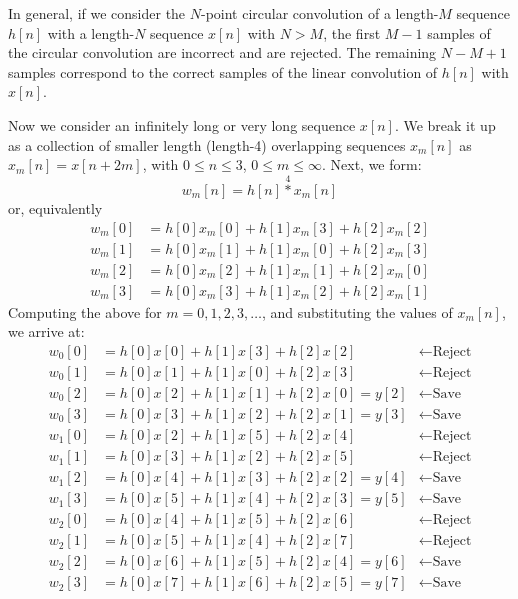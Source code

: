 \documentclass[../../main/main.tex]{subfiles}
\begin{document}
In general, if we consider the \( N \)-point circular convolution of a length-\( M \) sequence \( h[n] \) with a length-\( N \) sequence \( x[n] \) with \( N > M \), the first \( M - 1 \) samples of the circular convolution are incorrect and are rejected. The remaining \( N - M + 1 \) samples correspond to the correct samples of the linear convolution of \( h[n] \) with \( x[n] \).

Now we consider an infinitely long or very long sequence \( x[n] \). We break it up as a collection of smaller length (length-4) overlapping sequences \( x_{m}[n] \) as \( x_{m}[n] = x[n+2m] \), with \( 0 \le n \le 3 \), \( 0 \le m \le \infty \). Next, we form:
\begin{equation}
    w_{m}[n]
    =
    h[n] \overset{4}{*} x_{m}[n]
    \label{eq:L13_S35_1}
\end{equation}
or, equivalently
\begin{align}
    w_{m}[0] &= h[0]x_{m}[0] + h[1]x_{m}[3] + h[2]x_{m}[2]  \\
    w_{m}[1] &= h[0]x_{m}[1] + h[1]x_{m}[0] + h[2]x_{m}[3]  \\
    w_{m}[2] &= h[0]x_{m}[2] + h[1]x_{m}[1] + h[2]x_{m}[0]  \\
    w_{m}[3] &= h[0]x_{m}[3] + h[1]x_{m}[2] + h[2]x_{m}[1]
\end{align}
Computing the above for \( m = 0, 1, 2, 3, \dots \), and substituting the values of \( x_{m}[n] \), we arrive at:
\begin{align*}
    w_{0}[0] &= h[0]x[0] + h[1]x[3] + h[2]x[2]          &   \leftarrow \text{Reject}  \\
    w_{0}[1] &= h[0]x[1] + h[1]x[0] + h[2]x[3]          &   \leftarrow \text{Reject} \\
    w_{0}[2] &= h[0]x[2] + h[1]x[1] + h[2]x[0] = y[2]   &   \leftarrow \text{Save}  \\
    w_{0}[3] &= h[0]x[3] + h[1]x[2] + h[2]x[1] = y[3]   &   \leftarrow \text{Save}  \\
    w_{1}[0] &= h[0]x[2] + h[1]x[5] + h[2]x[4]          &   \leftarrow \text{Reject}  \\
    w_{1}[1] &= h[0]x[3] + h[1]x[2] + h[2]x[5]          &   \leftarrow \text{Reject} \\
    w_{1}[2] &= h[0]x[4] + h[1]x[3] + h[2]x[2] = y[4]   &   \leftarrow \text{Save}  \\
    w_{1}[3] &= h[0]x[5] + h[1]x[4] + h[2]x[3] = y[5]   &   \leftarrow \text{Save}  \\
    w_{2}[0] &= h[0]x[4] + h[1]x[5] + h[2]x[6]          &   \leftarrow \text{Reject}  \\
    w_{2}[1] &= h[0]x[5] + h[1]x[4] + h[2]x[7]          &   \leftarrow \text{Reject} \\
    w_{2}[2] &= h[0]x[6] + h[1]x[5] + h[2]x[4] = y[6]   &   \leftarrow \text{Save}  \\
    w_{2}[3] &= h[0]x[7] + h[1]x[6] + h[2]x[5] = y[7]   &   \leftarrow \text{Save}
\end{align*}
\end{document}
